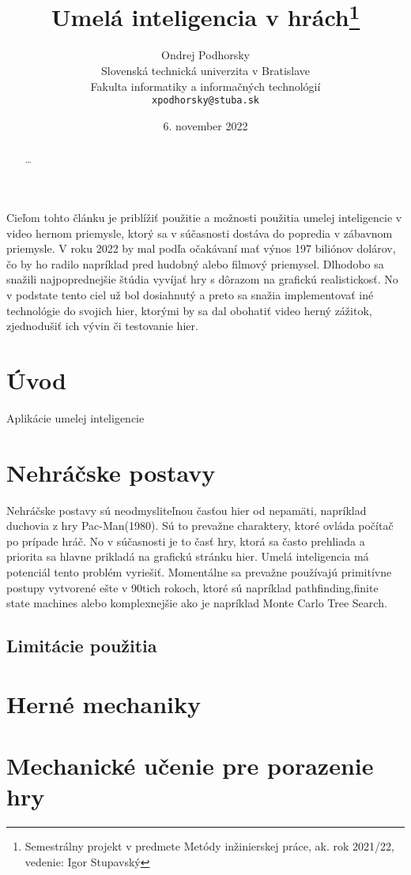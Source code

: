 \documentclass{article}
\title{Umelá inteligencia v hrách\thanks{Semestrálny projekt v predmete Metódy inžinierskej práce, ak. rok 2021/22, vedenie: Igor Stupavský}}
\author{Ondrej Podhorsky\\[2pt]
	{\small Slovenská technická univerzita v Bratislave}\\
	{\small Fakulta informatiky a informačných technológií}\\
	{\small \texttt{xpodhorsky@stuba.sk}}
	}
\date{\small 6. november 2022}
\begin{document}
\maketitle

\begin{abstract}
\ldots
\end{abstract}

Cieľom tohto článku je priblížiť použitie a možnosti použitia umelej inteligencie v video hernom priemysle, ktorý sa v súčasnosti dostáva do popredia v zábavnom priemysle. V roku 2022 by mal podľa očakávaní mať výnos 197 biliónov dolárov, čo by ho radilo napríklad pred hudobný alebo filmový priemysel. Dlhodobo sa snažili najpoprednejšie štúdia vyvíjať hry s dôrazom  na grafickú realistickosť. No v podstate tento ciel už bol dosiahnutý a preto sa snažia implementovať iné technológie do svojich hier, ktorými by sa dal obohatiť video herný zážitok, zjednodušiť ich vývin či testovanie hier.

\section{Úvod}

Aplikácie umelej inteligencie

\section{Nehráčske postavy}

Nehráčske postavy sú neodmysliteľnou časťou hier od nepamäti, napríklad duchovia z hry Pac-Man(1980). Sú to prevažne charaktery, ktoré ovláda počítač po prípade hráč. No v súčasnosti je to časť hry, ktorá sa často prehliada a priorita sa hlavne prikladá na grafickú stránku hier. Umelá inteligencia má potenciál tento problém vyriešiť. Momentálne sa prevažne používajú primitívne postupy vytvorené ešte v 90tich rokoch, ktoré sú napríklad pathfinding,finite state machines alebo komplexnejšie ako je napríklad Monte Carlo Tree Search.

\subsection{Limitácie použitia}

\section{Herné mechaniky}

\section{Mechanické učenie pre porazenie hry}
\end{document}
